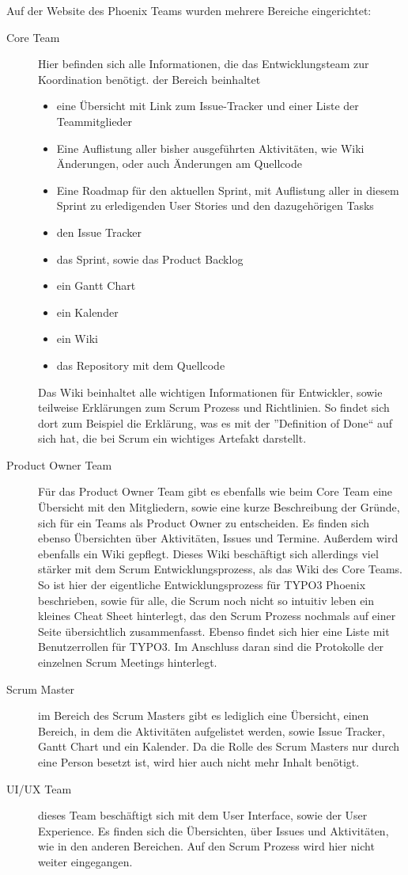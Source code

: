 Auf der Website des Phoenix Teams wurden mehrere Bereiche eingerichtet:
\begin{description}

\item [Core Team] Hier befinden sich alle Informationen, die das Entwicklungsteam zur Koordination benötigt. der Bereich beinhaltet
\begin{itemize}
\item eine Übersicht mit Link zum Issue-Tracker und einer Liste der Teammitglieder
\item Eine Auflistung aller bisher ausgeführten Aktivitäten, wie Wiki Änderungen, oder auch Änderungen am Quellcode
\item Eine Roadmap für den aktuellen Sprint, mit Auflistung aller in diesem Sprint zu erledigenden User Stories und den dazugehörigen Tasks
\item den Issue Tracker
\item das Sprint, sowie das Product Backlog
\item ein Gantt Chart
\item ein Kalender
\item  ein Wiki
\item das Repository mit dem Quellcode
\end{itemize}

Das Wiki beinhaltet alle wichtigen Informationen für Entwickler, sowie teilweise Erklärungen zum Scrum Prozess und Richtlinien.  So findet sich dort zum Beispiel die Erklärung, was es mit der ''Definition of Done``  auf sich hat, die bei Scrum ein wichtiges Artefakt darstellt.

\item [Product Owner Team] Für das Product Owner Team gibt es ebenfalls wie beim Core Team eine Übersicht mit den Mitgliedern, sowie eine kurze Beschreibung der Gründe, sich für ein Teams als Product Owner zu entscheiden. Es finden sich ebenso Übersichten über Aktivitäten, Issues und Termine. Außerdem wird ebenfalls ein Wiki gepflegt. Dieses Wiki beschäftigt sich   allerdings viel stärker mit dem Scrum Entwicklungsprozess, als das Wiki des Core Teams. So ist hier der eigentliche Entwicklungsprozess für TYPO3 Phoenix beschrieben, sowie für alle, die Scrum noch nicht so intuitiv leben ein kleines Cheat Sheet hinterlegt, das den Scrum Prozess nochmals auf einer Seite übersichtlich zusammenfasst. Ebenso findet sich hier eine Liste mit Benutzerrollen für TYPO3. Im Anschluss daran sind die Protokolle der einzelnen Scrum Meetings hinterlegt.

\item [Scrum Master] im Bereich des Scrum Masters gibt es lediglich eine Übersicht, einen Bereich, in dem die Aktivitäten aufgelistet werden, sowie Issue Tracker, Gantt Chart und ein Kalender. Da die Rolle des Scrum Masters nur durch eine Person besetzt ist, wird hier auch nicht mehr Inhalt benötigt.

\item [UI/UX Team] dieses Team beschäftigt sich mit dem User Interface, sowie der User Experience. Es finden sich die Übersichten, über Issues und Aktivitäten, wie in den anderen Bereichen. Auf den Scrum Prozess wird hier nicht weiter eingegangen. \cite{bib:forge}
\end{description}


